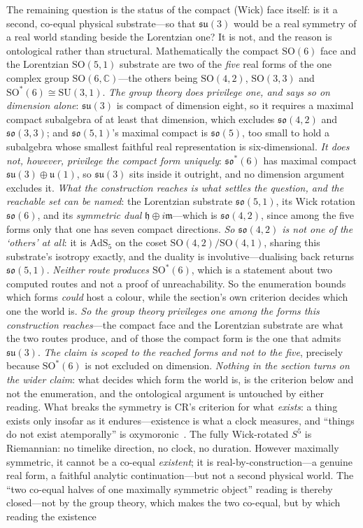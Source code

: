 \documentclass[11pt]{article}
\theoremstyle{plain}
\theoremstyle{remark}
\newcommand{\so}{\mathfrak{so}}
\newcommand{\su}{\mathfrak{su}}
\newcommand{\SO}{\mathrm{SO}}
\newcommand{\SU}{\mathrm{SU}}
\begin{document}
The remaining question is the status of the compact (Wick) face itself: is it a second, co-equal physical substrate---so that $\su(3)$ would be a real symmetry of a real world standing beside the Lorentzian one? It is not, and the reason is ontological rather than structural. Mathematically the compact $\SO(6)$ face and the Lorentzian $\SO(5,1)$ substrate are two of the \emph{five} real forms of the one complex group $\SO(6,\mathbb{C})$---the others being $\SO(4,2)$, $\SO(3,3)$ and $\SO^{*}(6)\cong\SU(3,1)$. \emph{The group theory does privilege one, and says so on dimension alone}: $\su(3)$ is compact of dimension eight, so it requires a maximal compact subalgebra of at least that dimension, which excludes $\so(4,2)$ and $\so(3,3)$; and $\so(5,1)$'s maximal compact is $\so(5)$, too small to hold a subalgebra whose smallest faithful real representation is six-dimensional. \emph{It does not, however, privilege the compact form uniquely}: $\so^{*}(6)$ has maximal compact $\su(3)\oplus\mathfrak{u}(1)$, so $\su(3)$ sits inside it outright, and no dimension argument excludes it. \emph{What the construction reaches is what settles the question, and the reachable set can be named}: the Lorentzian substrate $\so(5,1)$, its Wick rotation $\so(6)$, and its \emph{symmetric dual} $\mathfrak{h}\oplus i\mathfrak{m}$---which is $\so(4,2)$, since among the five forms only that one has seven compact directions. \emph{So $\so(4,2)$ is not one of the `others' at all}: it is $\mathrm{AdS}_5$ on the coset $\SO(4,2)/\SO(4,1)$, sharing this substrate's isotropy exactly, and the duality is involutive---dualising back returns $\so(5,1)$. \emph{Neither route produces $\SO^{*}(6)$}, which is a statement about two computed routes and not a proof of unreachability. So the enumeration bounds which forms \emph{could} host a colour, while the section's own criterion decides which one the world is. \emph{So the group theory privileges one among the forms this construction reaches}---the compact face and the Lorentzian substrate are what the two routes produce, and of those the compact form is the one that admits $\su(3)$. \emph{The claim is scoped to the reached forms and not to the five}, precisely because $\SO^{*}(6)$ is not excluded on dimension. \emph{Nothing in the section turns on the wider claim}: what decides which form the world is, is the criterion below and not the enumeration, and the ontological argument is untouched by either reading. What breaks the symmetry is CR's criterion for what \emph{exists}: a thing exists only insofar as it endures---existence is what a clock measures, and ``things do not exist atemporally'' is oxymoronic~\cite{JanzenCanonicalTime}. The fully Wick-rotated $S^5$ is Riemannian: no timelike direction, no clock, no duration. However maximally symmetric, it cannot be a co-equal \emph{existent}; it is real-by-construction---a genuine real form, a faithful analytic continuation---but not a second physical world. The ``two co-equal halves of one maximally symmetric object'' reading is thereby closed---not by the group theory, which makes the two co-equal, but by which reading the existence 
\end{document}
